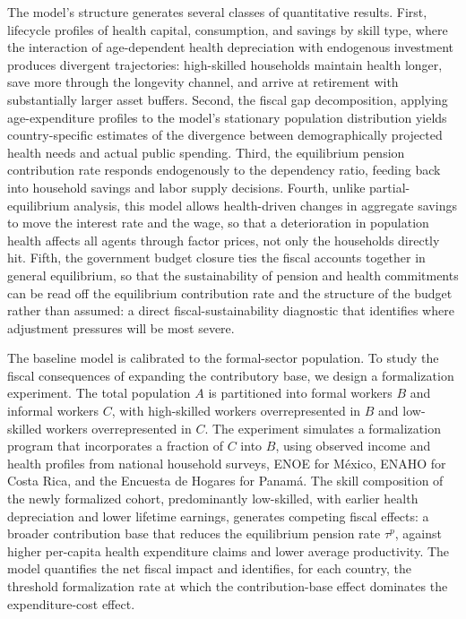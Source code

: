 \documentclass[12pt,a4paper]{article}
\begin{document}
The model's structure generates several classes of quantitative results. First, lifecycle profiles of health capital, consumption, and savings by skill type, where the interaction of age-dependent health depreciation with endogenous investment produces divergent trajectories: high-skilled households maintain health longer, save more through the longevity channel, and arrive at retirement with substantially larger asset buffers. Second, the fiscal gap decomposition, applying age-expenditure profiles to the model's stationary population distribution yields country-specific estimates of the divergence between demographically projected health needs and actual public spending. Third, the equilibrium pension contribution rate responds endogenously to the dependency ratio, feeding back into household savings and labor supply decisions. Fourth, unlike partial-equilibrium analysis, this model allows health-driven changes in aggregate savings to move the interest rate and the wage, so that a deterioration in population health affects all agents through factor prices, not only the households directly hit. Fifth, the government budget closure ties the fiscal accounts together in general equilibrium, so that the sustainability of pension and health commitments can be read off the equilibrium contribution rate and the structure of the budget rather than assumed: a direct fiscal-sustainability diagnostic that identifies where adjustment pressures will be most severe.

The baseline model is calibrated to the formal-sector population. To study the fiscal consequences of expanding the contributory base, we design a formalization experiment. The total population $A$ is partitioned into formal workers $B$ and informal workers $C$, with high-skilled workers overrepresented in $B$ and low-skilled workers overrepresented in $C$. The experiment simulates a formalization program that incorporates a fraction of $C$ into $B$, using observed income and health profiles from national household surveys, ENOE for M\'exico, ENAHO for Costa Rica, and the Encuesta de Hogares for Panam\'a. The skill composition of the newly formalized cohort, predominantly low-skilled, with earlier health depreciation and lower lifetime earnings, generates competing fiscal effects: a broader contribution base that reduces the equilibrium pension rate $\tau^p$, against higher per-capita health expenditure claims and lower average productivity. The model quantifies the net fiscal impact and identifies, for each country, the threshold formalization rate at which the contribution-base effect dominates the expenditure-cost effect.
\end{document}
